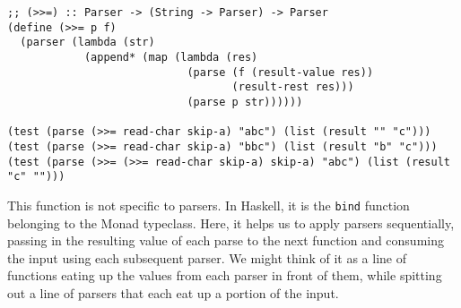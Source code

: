 \begin{verbatim}
;; (>>=) :: Parser -> (String -> Parser) -> Parser
(define (>>= p f)
  (parser (lambda (str)
            (append* (map (lambda (res)
                            (parse (f (result-value res))
                                   (result-rest res)))
                            (parse p str))))))

(test (parse (>>= read-char skip-a) "abc") (list (result "" "c")))
(test (parse (>>= read-char skip-a) "bbc") (list (result "b" "c")))
(test (parse (>>= (>>= read-char skip-a) skip-a) "abc") (list (result "c" "")))
\end{verbatim}
This function is not specific to parsers. In Haskell, it is the \texttt{bind} function belonging to the Monad typeclass. Here, it helps us to apply parsers sequentially, passing in the resulting value of each parse to the next function and consuming the input using each subsequent parser. We might think of it as a line of functions eating up the values from each parser in front of them, while spitting out a line of parsers that each eat up a portion of the input.

